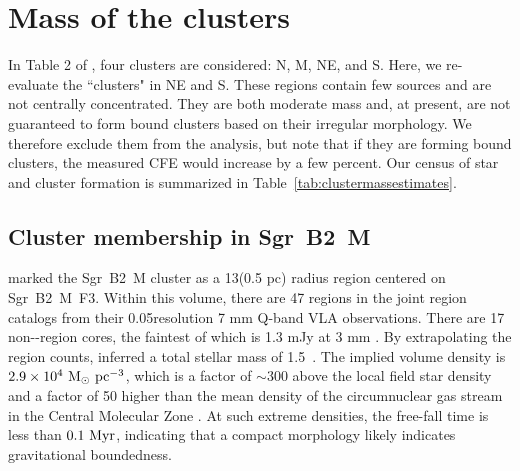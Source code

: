 \documentclass[twocolumn]{aastex62}
\begin{document}
\section{Mass of the clusters}

In Table 2 of \citet{Ginsburg2018a}, four clusters are considered: N, M, NE, and
S.  Here, we re-evaluate the ``clusters" in NE and S.  These regions contain
few sources and are not centrally concentrated.
They are both moderate mass and, at present, are not guaranteed to form bound
clusters based on their irregular morphology.  We therefore exclude them from
the analysis, but note that if they are forming bound clusters, the measured
CFE would increase by a few percent. Our census of star and cluster formation
is summarized in Table~\ref{tab:clustermassestimates}.



\subsection{Cluster membership in Sgr~B2~M}
\label{sec:mmass}
\citet{Schmiedeke2016a} marked the Sgr~B2~M cluster as a 13\arcsec  (0.5 pc) radius
region centered on Sgr~B2~M~F3.  Within this volume, there are 47 \hii regions
in the joint  \hii region catalogs \citep{Gaume1995a,De-Pree2015a} from their
0.05\arcsec resolution 7 mm Q-band
VLA observations.  There are 17 non-\hii-region cores, the faintest of which is
1.3 mJy at 3 mm \citep{Ginsburg2018a}.  By extrapolating the \hii region counts,
\citet{Ginsburg2018a} inferred a total stellar mass of 1.5~\msun. The
implied volume density is $2.9\times10^4~\mathrm{M}_{\odot}~\mathrm{pc}^{-3}$, which is a factor of
$\sim300$ above the local field star density
\citep{Launhardt2002a,Kruijssen2015a} and a factor of 50 higher than the mean
density of the circumnuclear gas stream in the Central Molecular Zone
\citep[CMZ; e.g.][]{Longmore2013b}. At such extreme densities, the free-fall
time is less than $0.1~\mathrm{Myr}$, indicating that a compact morphology likely
indicates gravitational boundedness.

% 
\end{document}
